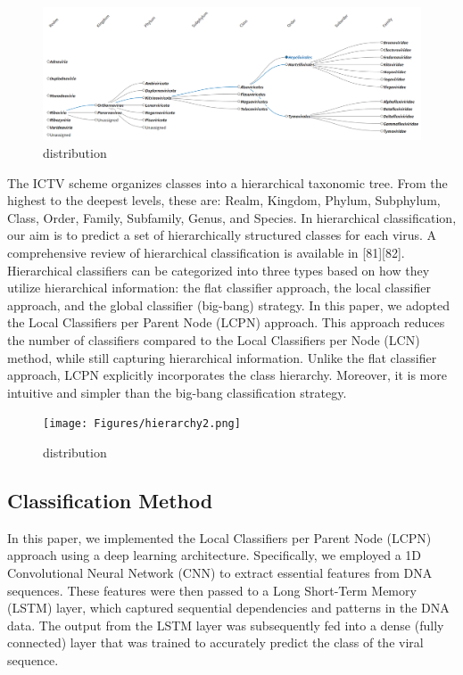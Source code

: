 \begin{figure}[t]
\begin{centering}
		\includegraphics[width=\textwidth]{Figures/heirarchy_IVT.png}
	\caption{distribution  }
\label{fig:distr}
\end{centering}
\end{figure}

The ICTV scheme organizes classes into a hierarchical taxonomic tree. From the highest to the deepest levels, these are: Realm, Kingdom, Phylum, Subphylum, Class, Order, Family, Subfamily, Genus, and Species. In hierarchical classification, our aim is to predict a set of hierarchically structured classes for each virus. A comprehensive review of hierarchical classification is available in [81][82]. Hierarchical classifiers can be categorized into three types based on how they utilize hierarchical information: the flat classifier approach, the local classifier approach, and the global classifier (big-bang) strategy. In this paper, we adopted the Local Classifiers per Parent Node (LCPN) approach. This approach reduces the number of classifiers compared to the Local Classifiers per Node (LCN) method, while still capturing hierarchical information. Unlike the flat classifier approach, LCPN explicitly incorporates the class hierarchy. Moreover, it is more intuitive and simpler than the big-bang classification strategy.

\begin{figure}[t]
\begin{centering}
		\texttt{[image: Figures/hierarchy2.png]}
	\caption{distribution  }
\label{fig:distr}
\end{centering}
\end{figure}

\subsection{Classification Method}

In this paper, we implemented the Local Classifiers per Parent Node (LCPN) approach using a deep learning architecture. Specifically, we employed a 1D Convolutional Neural Network (CNN) to extract essential features from DNA sequences. These features were then passed to a Long Short-Term Memory (LSTM) layer, which captured sequential dependencies and patterns in the DNA data. The output from the LSTM layer was subsequently fed into a dense (fully connected) layer that was trained to accurately predict the class of the viral sequence.

